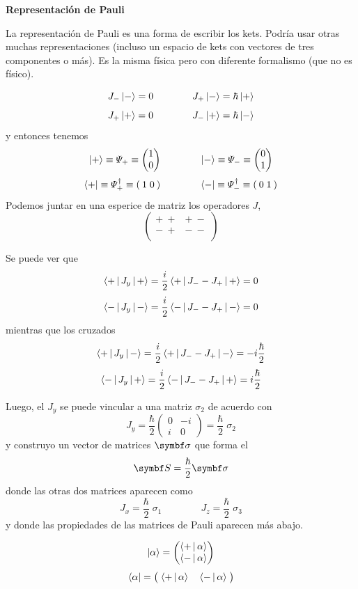 \documentclass[10pt,oneside]{CBFT_book}
\begin{document}
\begin{ejemplo}{\bf Representación de Pauli}

La representación de Pauli es una forma de escribir los kets. Podría usar otras muchas
representaciones (incluso un espacio de kets con vectores de tres componentes o más).
Es la misma física pero con diferente formalismo (que no es físico).

\[
	J_- \Ket{-} = 0 \qquad \qquad J_+ \Ket{-} = \hbar \Ket{+}
\]
\[
	J_+ \Ket{+} = 0 \qquad \qquad J_- \Ket{+} = \hbar \Ket{-}
\] 
y entonces tenemos 
\[
	\Ket{+} \equiv \Psi_+ \equiv \begin{pmatrix} 1 \\ 0  \end{pmatrix} 
	\qquad \qquad
	\Ket{-} \equiv \Psi_- \equiv \begin{pmatrix} 0 \\ 1  \end{pmatrix}
\]
\[
	\Bra{+} \equiv \Psi_+^\dagger \equiv ( \: 1 \; 0 \: )
	\qquad \qquad
	\Bra{-} \equiv \Psi_-^\dagger \equiv ( \: 0 \; 1 \: )
\]
Podemos juntar en una esperice de matriz los operadores $J$,
\[
	\begin{pmatrix}
		+ \: + & + \: - \\
		- \: + & - \: - \\
	\end{pmatrix}
\]

Se puede ver que
\[
	\Braket{+|J_y|+} = \frac{i}{2}\Braket{+|J_- - J_+|+} = 0
\]
\[
	\Braket{-|J_y|-} = \frac{i}{2}\Braket{-|J_- - J_+|-} = 0
\]
mientras que los cruzados
\[
	\Braket{+|J_y|-} = \frac{i}{2}\Braket{+|J_- - J_+|-} = -i \frac{\hbar}{2}
\]
\[
	\Braket{-|J_y|+} = \frac{i}{2}\Braket{-|J_- - J_+|+} = i \frac{\hbar}{2}
\]

Luego, el $J_y$ se puede vincular a una matriz $\sigma_2$ de acuerdo con
\[
	J_y = \frac{\hbar}{2} \begin{pmatrix} 0 & -i \\ i & 0 \end{pmatrix} = 
	\frac{\hbar}{2} \; \sigma_2
\]
y construyo un vector de matrices $\vb{\sigma}$ que forma el 
\[
	\vb{S} = \frac{\hbar}{2} \vb{\sigma}
\]
donde las otras dos matrices aparecen como 
\[
	J_x = \frac{\hbar}{2} \; \sigma_1 \qquad \qquad J_z = \frac{\hbar}{2} \; \sigma_3
\]
y donde las propiedades de las matrices de Pauli aparecen más abajo.
\end{ejemplo}

\[
	\Ket{\alpha} = \begin{pmatrix}   \Braket{+|\alpha} \\ \Braket{-|\alpha}  \end{pmatrix}
\]
\[
	\Bra{\alpha} = \begin{pmatrix}  \; \Braket{+|\alpha} \quad \Braket{-|\alpha} \;  \end{pmatrix}
\]
\end{document}

